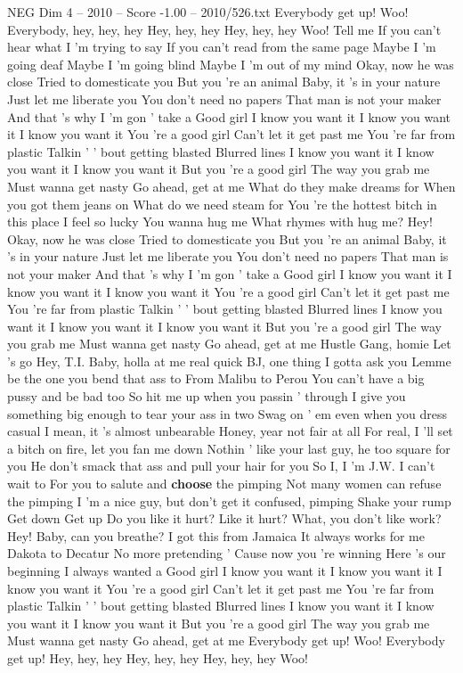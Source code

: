 \begin{textsample}{NEG Dim 4 – 2010 – Score -1.00 – 2010/526.txt}  \label{ex:f4_neg_011}
Everybody get up!
Woo!
Everybody, hey, hey, hey Hey, hey, hey Hey, hey, hey Woo!
Tell me If you can't hear what I 'm trying to say If you can't read from the same page Maybe I 'm going deaf Maybe I 'm going blind Maybe I 'm out of my mind Okay, now he was close Tried to domesticate you But you 're an animal Baby, it 's in your nature Just let me liberate you You don't need no papers That man is not your maker And that 's why I 'm gon ' take a Good girl I know you want it I know you want it I know you want it You 're a good girl Can't let it get past me You 're far from plastic Talkin ' ' bout getting blasted Blurred lines I know you want it I know you want it I know you want it But you 're a good girl The way you grab me Must wanna get nasty Go ahead, get at me What do they make dreams for When you got them jeans on What do we need steam for You 're the hottest bitch in this place I feel so lucky You wanna hug me What rhymes with hug me?
Hey!
Okay, now he was close Tried to domesticate you But you 're an animal Baby, it 's in your nature Just let me liberate you You don't need no papers That man is not your maker And that 's why I 'm gon ' take a Good girl I know you want it I know you want it I know you want it You 're a good girl Can't let it get past me You 're far from plastic Talkin ' ' bout getting blasted Blurred lines I know you want it I know you want it I know you want it But you 're a good girl The way you grab me Must wanna get nasty Go ahead, get at me Hustle Gang, homie Let 's go Hey, T.I.
Baby, holla at me real quick BJ, one thing I gotta ask you Lemme be the one you bend that ass to From Malibu to Perou You can't have a big pussy and be bad too So hit me up when you passin ' through I give you something big enough to tear your ass in two Swag on ' em even when you dress casual I mean, it 's almost unbearable Honey, year not fair at all For real, I 'll set a bitch on fire, let you fan me down Nothin ' like your last guy, he too square for you He don't smack that ass and pull your hair for you So I, I 'm J.W.
I can't wait to For you to salute and \textbf{choose} the pimping Not many women can refuse the pimping I 'm a nice guy, but don't get it confused, pimping Shake your rump Get down Get up Do you like it hurt?
Like it hurt?
What, you don't like work?
Hey!
Baby, can you breathe?
I got this from Jamaica It always works for me Dakota to Decatur No more pretending ' Cause now you 're winning Here 's our beginning I always wanted a Good girl I know you want it I know you want it I know you want it You 're a good girl Can't let it get past me You 're far from plastic Talkin ' ' bout getting blasted Blurred lines I know you want it I know you want it I know you want it But you 're a good girl The way you grab me Must wanna get nasty Go ahead, get at me Everybody get up!
Woo!
Everybody get up!
Hey, hey, hey Hey, hey, hey Hey, hey, hey Woo!

\end{textsample}

